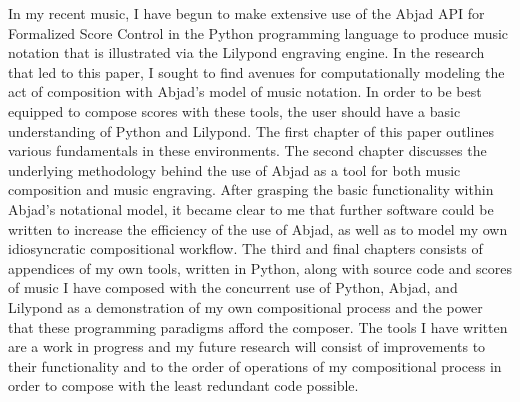 
In my recent music, I have begun to make extensive use of the Abjad API for Formalized Score Control in the Python programming language to produce music notation that is illustrated via the Lilypond engraving engine. In the research that led to this paper, I sought to find avenues for computationally modeling the act of composition with Abjad's model of music notation. In order to be best equipped to compose scores with these tools, the user should have a basic understanding of Python and Lilypond. The first chapter of this paper outlines various fundamentals in these environments. The second chapter discusses the underlying methodology behind the use of Abjad as a tool for both music composition and music engraving. After grasping the basic functionality within Abjad's notational model, it became clear to me that further software could be written to increase the efficiency of the use of Abjad, as well as to model my own idiosyncratic compositional workflow. The third and final chapters consists of appendices of my own tools, written in Python, along with source code and scores of music I have composed with the concurrent use of Python, Abjad, and Lilypond as a demonstration of my own compositional process and the power that these programming paradigms afford the composer. The tools I have written are a work in progress and my future research will consist of improvements to their functionality and to the order of operations of my compositional process in order to compose with the least redundant code possible.